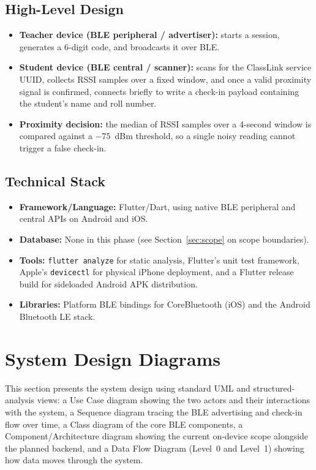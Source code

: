 \documentclass[12pt,a4paper]{report}
\begin{document}
\subsection{High-Level Design}
\begin{itemize}
  \item \textbf{Teacher device (BLE peripheral / advertiser):} starts a session, generates a 6-digit code, and broadcasts it over BLE.
  \item \textbf{Student device (BLE central / scanner):} scans for the ClassLink service UUID, collects RSSI samples over a fixed window, and once a valid proximity signal is confirmed, connects briefly to write a check-in payload containing the student's name and roll number.
  \item \textbf{Proximity decision:} the median of RSSI samples over a 4-second window is compared against a $-75$~dBm threshold, so a single noisy reading cannot trigger a false check-in.
\end{itemize}

\subsection{Technical Stack}
\begin{itemize}
  \item \textbf{Framework/Language:} Flutter/Dart, using native BLE peripheral and central APIs on Android and iOS.
  \item \textbf{Database:} None in this phase (see Section~\ref{sec:scope} on scope boundaries).
  \item \textbf{Tools:} \texttt{flutter analyze} for static analysis, Flutter's unit test framework, Apple's \texttt{devicectl} for physical iPhone deployment, and a Flutter release build for sideloaded Android APK distribution.
  \item \textbf{Libraries:} Platform BLE bindings for CoreBluetooth (iOS) and the Android Bluetooth LE stack.
\end{itemize}

\section{System Design Diagrams}
This section presents the system design using standard UML and structured-analysis views: a Use Case diagram showing the two actors and their interactions with the system, a Sequence diagram tracing the BLE advertising and check-in flow over time, a Class diagram of the core BLE components, a Component/Architecture diagram showing the current on-device scope alongside the planned backend, and a Data Flow Diagram (Level~0 and Level~1) showing how data moves through the system.
\end{document}
